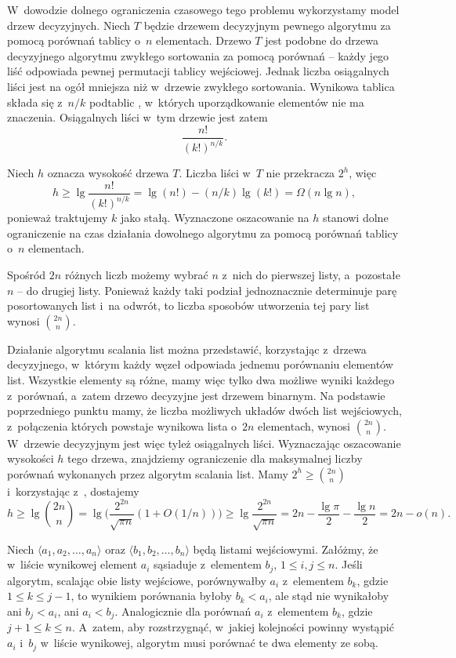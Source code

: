 W~dowodzie dolnego ograniczenia czasowego tego problemu wykorzystamy model drzew decyzyjnych. Niech $T$ będzie drzewem decyzyjnym pewnego algorytmu  za pomocą porównań tablicy o~$n$ elementach. Drzewo $T$ jest podobne do drzewa decyzyjnego algorytmu zwykłego sortowania za pomocą porównań -- każdy jego liść odpowiada pewnej permutacji tablicy wejściowej. Jednak liczba osiągalnych liści jest na ogół mniejsza niż w~drzewie zwykłego sortowania. Wynikowa tablica składa się z~$n/k$ podtablic , w~których uporządkowanie elementów nie ma znaczenia. Osiągalnych liści w~tym drzewie jest zatem
\[
    \frac{n!}{(k!)^{n/k}}.
\]

Niech $h$ oznacza wysokość drzewa $T$. Liczba liści w~$T$ nie przekracza $2^h$, więc
\[
    h \ge \lg\frac{n!}{(k!)^{n/k}} = \lg(n!)-(n/k)\lg(k!) = \Omega(n\lg n),
\]
ponieważ traktujemy $k$ jako stałą. Wyznaczone oszacowanie na $h$ stanowi dolne ograniczenie na czas działania dowolnego algorytmu  za pomocą porównań tablicy o~$n$ elementach. 


\subproblem %
Spośród $2n$ różnych liczb możemy wybrać $n$ z~nich do pierwszej listy, a~pozostałe $n$ -- do drugiej listy. Ponieważ każdy taki podział jednoznacznie determinuje parę posortowanych list i~na odwrót, to liczba sposobów utworzenia tej pary list wynosi $\binom{2n}{n}$.

\subproblem %
Działanie algorytmu scalania list można przedstawić, korzystając z~drzewa decyzyjnego, w~którym każdy węzeł odpowiada jednemu porównaniu elementów list. Wszystkie elementy są różne, mamy więc tylko dwa możliwe wyniki każdego z~porównań, a~zatem drzewo decyzyjne jest drzewem binarnym. Na podstawie poprzedniego punktu mamy, że liczba możliwych układów dwóch  list wejściowych, z~połączenia których powstaje wynikowa lista o~$2n$ elementach, wynosi $\binom{2n}{n}$. W~drzewie decyzyjnym jest więc tyleż osiągalnych liści. Wyznaczając oszacowanie wysokości $h$ tego drzewa, znajdziemy ograniczenie dla maksymalnej liczby porównań wykonanych przez algorytm scalania list. Mamy $2^h\ge\binom{2n}{n}$ i~korzystając z~, dostajemy
\[
    h \ge \lg\binom{2n}{n} = \lg\biggl(\frac{2^{2n}}{\sqrt{\pi n}}(1+O(1/n))\biggr) \ge \lg\frac{2^{2n}}{\sqrt{\pi n}} = 2n-\frac{\lg\pi}{2}-\frac{\lg n}{2} = 2n-o(n).
\]

\subproblem %
Niech $\langle a_1,a_2,\dots,a_n\rangle$ oraz $\langle b_1,b_2,\dots,b_n\rangle$ będą listami wejściowymi. Załóżmy, że w~liście wynikowej element $a_i$ sąsiaduje z~elementem $b_j$, $1\le i,j\le n$. Jeśli algorytm, scalając obie listy wejściowe, porównywałby $a_i$ z~elementem $b_k$, gdzie $1\le k\le j-1$, to wynikiem porównania byłoby $b_k<a_i$, ale stąd nie wynikałoby ani $b_j<a_i$, ani $a_i<b_j$. Analogicznie dla porównań $a_i$ z~elementem $b_k$, gdzie $j+1\le k\le n$. A~zatem, aby rozstrzygnąć, w~jakiej kolejności powinny wystąpić $a_i$ i~$b_j$ w~liście wynikowej, algorytm musi porównać te dwa elementy ze sobą.

